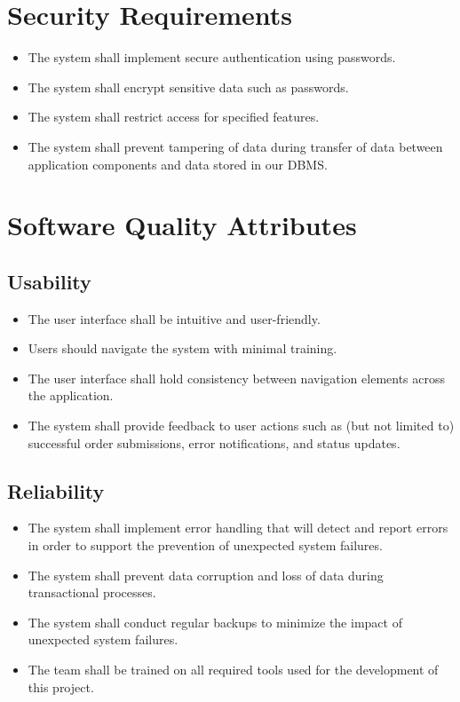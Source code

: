 \documentclass[letterpaper,12pt,oneside,listof=totoc]{scrreprt}
\begin{document}
\section{Security Requirements}
\begin{itemize}
\item The system shall implement secure authentication using passwords.
\item The system shall encrypt sensitive data such as passwords.
\item The system shall restrict access for specified features.
\item The system shall prevent tampering of data during transfer of data between application components and data stored in our DBMS.
\end{itemize}

\section{Software Quality Attributes}

\subsection{Usability}
    \begin{itemize}
        \item The user interface shall be intuitive and user-friendly.
        \item Users should navigate the system with minimal training.
        \item The user interface shall hold consistency between navigation elements across the application.
        \item The system shall provide feedback to user actions such as (but not limited to) successful order submissions, error notifications, and status updates.
    \end{itemize}

\subsection{Reliability}
    \begin{itemize}
        \item The system shall implement error handling that will detect and report errors in order to support the prevention of unexpected system failures.
        \item The system shall prevent data corruption and loss of data during transactional processes.
        \item The system shall conduct regular backups to minimize the impact of unexpected system failures.
        \item The team shall be trained on all required tools used for the development of this project.
    \end{itemize}
\end{document}
